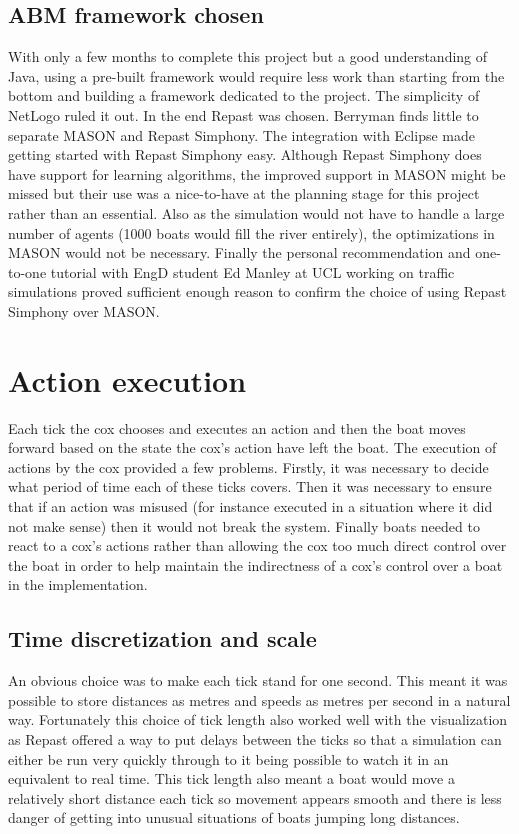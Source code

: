     \subsection{ABM framework chosen}
    With only a few months to complete this project but a good understanding of Java, using a pre-built framework would require less work than starting from the bottom and building a framework dedicated to the project. The simplicity of NetLogo ruled it out. In the end Repast was chosen. Berryman finds little to separate MASON and Repast Simphony. The integration with Eclipse made getting started with Repast Simphony easy. Although Repast Simphony does have support for learning algorithms, the improved support in MASON might be missed but their use was a nice-to-have at the planning stage for this project rather than an essential. Also as the simulation would not have to handle a large number of agents (1000 boats would fill the river entirely), the optimizations in MASON would not be necessary. Finally the personal recommendation and one-to-one tutorial with EngD student Ed Manley \cite{Manley2012} at UCL working on traffic simulations proved sufficient enough reason to confirm the choice of using Repast Simphony over MASON.
  
  \section{Action execution}
    Each tick the cox chooses and executes an action and then the boat moves forward based on the state the cox's action have left the boat. The execution of actions by the cox provided a few problems. Firstly, it was  necessary to decide what period of time each of these ticks covers. Then it was necessary to ensure that if an action was misused (for instance executed in a situation where it did not make sense) then it would not break the system. Finally boats needed to react to a cox's actions rather than allowing the cox too much direct control over the boat in order to help maintain the indirectness of a cox's control over a boat in the implementation.
    
    \subsection{Time discretization and scale}
    An obvious choice was to make each tick stand for one second. This meant it was possible to store distances as metres and speeds as metres per second in a natural way. Fortunately this choice of tick length also worked well with the visualization as Repast offered a way to put delays between the ticks so that a simulation can either be run very quickly through to it being possible to watch it in an equivalent to real time. This tick length also meant a boat would move a relatively short distance each tick so movement appears smooth and there is less danger of getting into unusual situations of boats jumping long distances.
    
